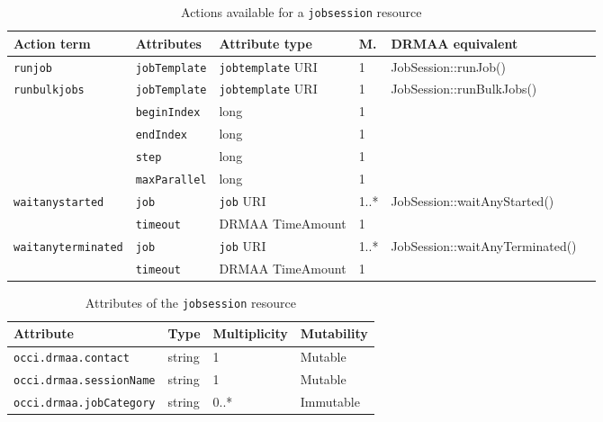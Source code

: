 \documentclass[10pt]{article}
\newcommand{\h}[1]{\lstinline|#1|}
\begin{document}
\begin{table}[ht]
\centering
\begin{tabularx}{\textwidth}{|l|l|l|X|l|l|}
\hline
Action term           & Attributes & Attribute type      & M. & DRMAA equivalent \\
\hline
\h{runjob}            & \h{jobTemplate}     & \h{jobtemplate} URI & 1                      & JobSession::runJob() \\
\h{runbulkjobs}       & \h{jobTemplate}     & \h{jobtemplate} URI & 1                      & JobSession::runBulkJobs() \\
                      & \h{beginIndex}      & long          & 1                      &\\
                      & \h{endIndex}        & long          & 1                      &\\
                      & \h{step}            & long          & 1                      &\\
                      & \h{maxParallel}     & long          & 1                      &\\
\h{waitanystarted}    & \h{job}             & \h{job} URI         & 1..*                   & JobSession::waitAnyStarted()\\
                      & \h{timeout}         & DRMAA TimeAmount    & 1                      &\\
\h{waitanyterminated} & \h{job}             & \h{job} URI         & 1..*                   & JobSession::waitAnyTerminated()\\
                      & \h{timeout}         & DRMAA TimeAmount    & 1                      &\\
\hline
\end{tabularx}
\caption{Actions available for a \h{jobsession} resource}
\label{tab:jobsessionactions}
\end{table}

\begin{table}[ht]
\centering
\begin{tabularx}{\textwidth}{|l|X|X|X|}
\hline
Attribute       & Type   & Multiplicity & Mutability \\
\hline
\h{occi.drmaa.contact}     & string       & 1            & Mutable    \\ %
\h{occi.drmaa.sessionName} & string       & 1            & Mutable    \\ %
\h{occi.drmaa.jobCategory} & string       & 0..*         & Immutable  \\ %
\hline
\end{tabularx}
\caption{Attributes of the \h{jobsession} resource}
\label{tab:jobsessionattributes}
\end{table}
\end{document}
